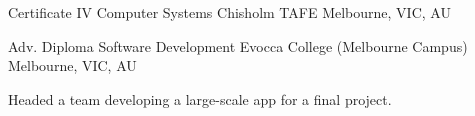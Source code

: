 

\begin{cventries}

  \cventry
    {Certificate IV Computer Systems} %
    {Chisholm TAFE} %
    {}
    {Melbourne, VIC, AU} %

  \cventry
    {Adv. Diploma Software Development} %
    {Evocca College (Melbourne Campus)} %
    {}
    {Melbourne, VIC, AU} %
    {
      \begin{cvitems}
        \item {Headed a team developing a large-scale app for a final project.}
      \end{cvitems}
    }
\end{cventries}
